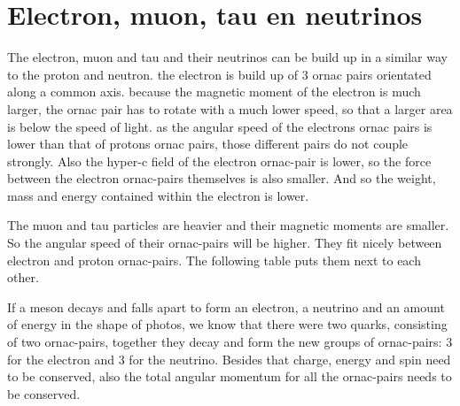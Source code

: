 \chapter{Electron, muon, tau en neutrinos}

The electron, muon and tau and their neutrinos can be build up in a similar way to the proton and neutron. the electron is build up of 3 ornac pairs orientated along a common axis. because the magnetic moment of the electron is much larger, the ornac pair has to rotate with a much lower speed, so that a larger area is below the speed of light. as the angular speed of the electrons ornac pairs is lower than that of protons ornac pairs, those different pairs do not couple strongly. Also the hyper-c field of the electron ornac-pair is lower, so the force between the electron ornac-pairs themselves is also smaller. And so the weight, mass and energy contained within the electron is lower.

The muon and tau particles are heavier and their magnetic moments are smaller. So the angular speed of their ornac-pairs will be higher. They fit nicely between electron and proton ornac-pairs. The following table puts them next to each other.

If a meson decays and falls apart to form an electron, a neutrino and an amount of energy in the shape of photos, we know that there were two quarks, consisting of two ornac-pairs, together they decay and form the new groups of ornac-pairs: 3 for the electron and 3 for the neutrino. Besides that charge, energy and spin need to be conserved, also the total angular momentum for all the ornac-pairs needs to be conserved.


